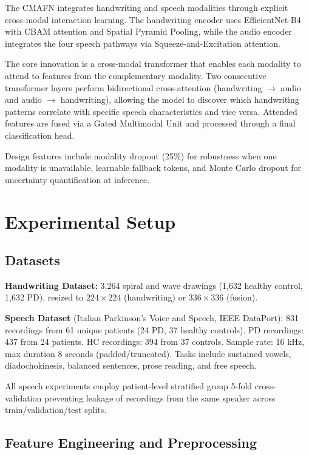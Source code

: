 \documentclass[10pt,conference,letterpaper]{IEEEtran}
\begin{document}
The CMAFN integrates handwriting and speech modalities through explicit cross-modal interaction learning. The handwriting encoder uses EfficientNet-B4 with CBAM attention and Spatial Pyramid Pooling, while the audio encoder integrates the four speech pathways via Squeeze-and-Excitation attention.

The core innovation is a cross-modal transformer that enables each modality to attend to features from the complementary modality. Two consecutive transformer layers perform bidirectional cross-attention (handwriting $\rightarrow$ audio and audio $\rightarrow$ handwriting), allowing the model to discover which handwriting patterns correlate with specific speech characteristics and vice versa. Attended features are fused via a Gated Multimodal Unit and processed through a final classification head.

Design features include modality dropout (25\%) for robustness when one modality is unavailable, learnable fallback tokens, and Monte Carlo dropout for uncertainty quantification at inference.

\section{Experimental Setup}

\subsection{Datasets}

\textbf{Handwriting Dataset:} 3,264 spiral and wave drawings (1,632 healthy control, 1,632 PD), resized to $224 \times 224$ (handwriting) or $336 \times 336$ (fusion).

\textbf{Speech Dataset} (Italian Parkinson's Voice and Speech, IEEE DataPort): 831 recordings from 61 unique patients (24 PD, 37 healthy controls). PD recordings: 437 from 24 patients. HC recordings: 394 from 37 controls. Sample rate: 16 kHz, max duration 8 seconds (padded/truncated). Tasks include sustained vowels, diadochokinesis, balanced sentences, prose reading, and free speech.

All speech experiments employ patient-level stratified group 5-fold cross-validation preventing leakage of recordings from the same speaker across train/validation/test splits.

\subsection{Feature Engineering and Preprocessing}
\end{document}
